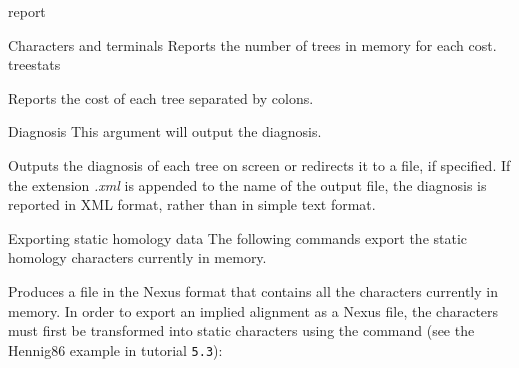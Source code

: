 \begin{command}{report}{}
\begin{arguments}
\begin{argumentgroup}{Characters and terminals}
                {Reports the number of trees in memory for each cost.}
                {treestats}

                {Reports the cost of each tree separated by colons.}
                {}
        \end{argumentgroup}

        \begin{argumentgroup}{Diagnosis}
            {This argument will output the diagnosis.} 

                {Outputs the diagnosis of each tree on screen or redirects it to a file, if
                specified. If the extension \emph{.xml} is appended to the name of the
                output file, the diagnosis is reported in XML format, rather than in
                simple text format.} 
                {}
        \end{argumentgroup} 
        
         \begin{argumentgroup}{Exporting static homology data}
            {The following commands export the static homology characters
            currently in memory.}

                {Produces a file in the Nexus format that contains all the
                characters currently in memory.  In
                order to export an implied alignment as a Nexus file, the
                characters must first be transformed into static characters
                using the  command (see the Hennig86 
                example in tutorial \texttt{5.3}): 
                \begin{flushleft}
                     \\
                \end{flushleft}}
                {}
                

\end{argumentgroup}
\end{arguments}
\end{command}

